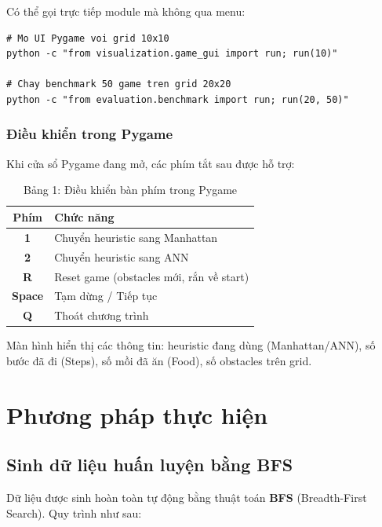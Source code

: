 \documentclass[12pt,a4paper]{article}
\begin{document}
Có thể gọi trực tiếp module mà không qua menu:

\begin{lstlisting}
# Mo UI Pygame voi grid 10x10
python -c "from visualization.game_gui import run; run(10)"

# Chay benchmark 50 game tren grid 20x20
python -c "from evaluation.benchmark import run; run(20, 50)"
\end{lstlisting}

\subsubsection{Điều khiển trong Pygame}

Khi cửa sổ Pygame đang mở, các phím tắt sau được hỗ trợ:

\begin{table}[ht]
\centering
\begin{tabular}{|c|l|}
\hline
\textbf{Phím} & \textbf{Chức năng} \\
\hline
\textbf{1} & Chuyển heuristic sang Manhattan \\
\textbf{2} & Chuyển heuristic sang ANN \\
\textbf{R} & Reset game (obstacles mới, rắn về start) \\
\textbf{Space} & Tạm dừng / Tiếp tục \\
\textbf{Q} & Thoát chương trình \\
\hline
\end{tabular}
\caption{Bảng 1: Điều khiển bàn phím trong Pygame}
\label{tab:keys}
\end{table}

Màn hình hiển thị các thông tin: heuristic đang dùng (Manhattan/ANN), số bước đã đi (Steps), số mồi đã ăn (Food), số obstacles trên grid.

\newpage

\section{Phương pháp thực hiện}

\subsection{Sinh dữ liệu huấn luyện bằng BFS}

Dữ liệu được sinh hoàn toàn tự động bằng thuật toán \textbf{BFS} (Breadth-First Search). Quy trình như sau:
\end{document}
